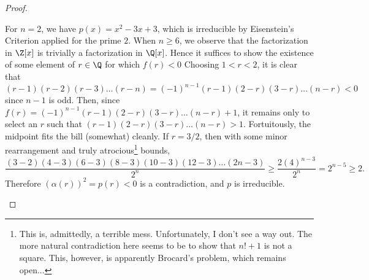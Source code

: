 \documentclass[10pt]{amsart}
\begin{document}
\begin{thm}
\begin{proof}
\begin{enumerate}[(a)]
      For $n = 2$, we have $p(x) = x^2 - 3x + 3$, which is irreducible by Eisenstein's Criterion applied for the prime $2$.
      When $n \geq 6$, we observe that the factorization in $\Z[x]$ is trivially a factorization in $\Q[x]$.
      Hence it suffices to show the existence of some element of $r \in \Q$ for which $f(r) < 0$
      Choosing $1 < r < 2$, it is clear that
      $$(r - 1)(r - 2)(r - 3)\ldots(r - n) = (-1)^{n-1}(r - 1)(2 - r)(3 - r)\ldots(n - r) < 0$$
      since $n-1$ is odd.
      Then, since $f(r) = (-1)^{n-1}(r - 1)(2 - r)(3 - r)\ldots(n - r) + 1$, it remains only to select an $r$ such that $(r - 1)(2 - r)(3 - r)\ldots(n - r) > 1$.
      Fortuitously, the midpoint fits the bill (somewhat) cleanly.
      If $r = 3/2$, then with some minor rearrangement and truly atrocious\footnote{This is, admittedly, a terrible mess.  Unfortunately, I don't see a way out.  The more natural contradiction here seems to be to show that $n! + 1$ is not a square.  This, however, is apparently Brocard's problem, which remains open...} bounds,
      $$\frac{(3 - 2)(4 - 3)(6 - 3)(8 - 3)(10 - 3)(12  - 3)\ldots(2n - 3)}{2^n} \geq \frac{2(4)^{n-3}}{2^n} = 2^{n-5} \geq 2.$$
      Therefore $(\alpha(r))^2 = p(r) < 0$ is a contradiction, and $p$ is irreducible.
    \end{enumerate}  
  \end{proof}
\end{thm}
\end{document}
